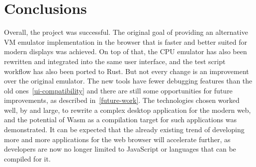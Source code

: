 \section{Conclusions}
Overall, the project was successful.
The original goal of providing an alternative VM emulator implementation in the browser that is faster and better suited for modern displays was achieved.
On top of that, the CPU emulator has also been rewritten and integrated into the same user interface, and the test script workflow has also been ported to Rust.
But not every change is an improvement over the original emulator.
The new tools have fewer debugging features than the old ones~\ref{ui-compatibility} and there are still some opportunities for future improvements, as described in~\cref{future-work}.
The technologies chosen worked well, by and large, to rewrite a complex desktop application for the modern web, and the potential of Wasm as a compilation target for such applications was demonstrated.
It can be expected that the already existing trend of developing more and more applications for the web browser will accelerate further, as developers are now no longer limited to JavaScript or languages that can be compiled for it.


